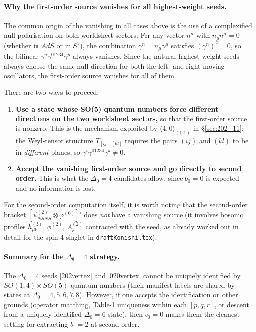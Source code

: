 \documentclass[12pt]{article}
\newcommand{\D}{\ensuremath{\Delta}}
\begin{document}
\paragraph{Why the first-order source vanishes for all highest-weight seeds.}
The common origin of the vanishing in all cases above is the use of a complexified
null polarisation on both worldsheet sectors. For any vector $n^\mu$ with $n_\mu n^\mu=0$
(whether in $AdS$ or in $S^5$), the combination
$\gamma^{n}=n_\mu\gamma^\mu$ satisfies $(\gamma^n)^2=0$,
so the bilinear $\gamma^n\gamma^{01234}\gamma^n$ always vanishes.
Since the natural highest-weight seeds always choose the same null direction for both the
left- and right-moving oscillators, the first-order source vanishes for all of them.

There are two ways to proceed:
\begin{enumerate}
\item \textbf{Use a state whose SO(5) quantum numbers force different directions on the two
worldsheet sectors,} so that the first-order source is nonzero. This is the mechanism exploited
by $\langle 4,0\rangle_{(1,1)}$ in \S\ref{sec:202_11}: the Weyl-tensor structure
$T_{[ij],[kl]}$ requires the pairs $(ij)$ and $(kl)$ to be in \emph{different} planes,
so $\gamma^i\gamma^{01234}\gamma^k\neq 0$.
\item \textbf{Accept the vanishing first-order source and go directly to second order.}
This is what the $\D_0=4$ candidates allow, since $b_0=0$ is expected and
no information is lost.
\end{enumerate}

For the second-order computation itself, it is worth noting that the second-order bracket
$[\psi^{(2)}_{NSNS}\otimes\varphi^{(0)}]'$ does \emph{not} have a vanishing source
(it involves bosonic profiles $h_{\mu\nu}^{(2)}$, $\phi^{(2)}$, $A_\mu^{(2)}$
contracted with the seed, as already worked out in detail for the spin-4 singlet in
\texttt{draftKonishi.tex}).

\paragraph{Summary for the $\D_0=4$ strategy.}
The $\D_0=4$ seeds \eqref{202vertex} and \eqref{020vertex} cannot be uniquely identified by
$SO(1,4)\times SO(5)$ quantum numbers (their manifest labels are shared by states at
$\D_0=4,5,6,7,8$). However, if one accepts the identification on other grounds
(operator matching, Table-1 uniqueness within each $[p,q,r]$, or descent from a uniquely
identified $\D_0=6$ state), then $b_0=0$ makes them the cleanest setting for extracting $b_1=2$
at second order.
\end{document}
